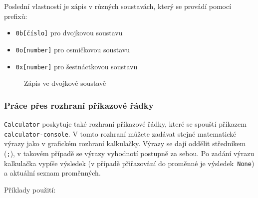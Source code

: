 \documentclass[a4paper, 11pt]{article}
\begin{document}
\noindent
Poslední vlastností je zápis v různých soustavách, který se provádí pomocí
prefixů:
\begin{itemize}
    \item \texttt{0b{[}číslo{]}} pro dvojkovou soustavu 
    \item \texttt{0o{[}number{]}} pro osmičkovou soustavu 
    \item \texttt{0x{[}number{]}} pro šestnáctkovou soustavu
\end{itemize}

\begin{figure}[H]
    \centering
    \caption{Zápis ve dvojkové soustavě}
\end{figure}

\subsubsection{Práce přes rozhraní příkazové řádky}
\texttt{Calculator} poskytuje také rozhraní příkazové řádky, které se spouští příkazem\texttt{ calculator-console}.
V tomto rozhraní můžete zadávat stejné matematické výrazy jako v grafickém rozhraní kalkulačky. Výrazy se dají oddělit středníkem (\texttt{;}), v takovém případě se výrazy vyhodnotí postupně za sebou. Po zadání výrazu kalkulačka vypíše výsledek (v případě přiřazování do proměnné je výsledek\texttt{ None}) a aktuální seznam proměnných.
\vspace{0.5cm}

\noindent
Příklady použití:
\end{document}
